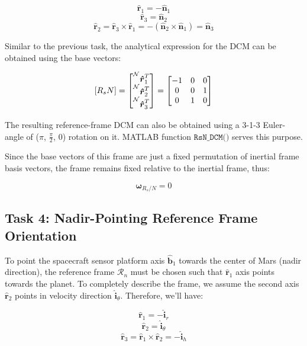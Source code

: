 \documentclass[12pt,a4paper]{report}
\begin{document}
	$$ \boldsymbol{\hat{r}}_1 = -\boldsymbol{\hat{n}}_1 $$
	$$ \boldsymbol{\hat{r}}_3 = \boldsymbol{\hat{n}}_2 $$
	$$ \boldsymbol{\hat{r}}_2 = \boldsymbol{\hat{r}}_3 \times \boldsymbol{\hat{r}}_1 = -(\boldsymbol{\hat{n}}_2\times\boldsymbol{\hat{n}}_1) = \boldsymbol{\hat{n}}_3$$
	
	Similar to the previous task, the analytical expression for the DCM can be obtained using the base vectors:
	
	$$[R_sN] = 
	\begin{bmatrix}
		\prescript{\mathcal{N}}{}{\boldsymbol{\hat{r}}_1 ^ T} \\
		\prescript{\mathcal{N}}{}{\boldsymbol{\hat{r}}_2 ^ T} \\
		\prescript{\mathcal{N}}{}{\boldsymbol{\hat{r}}_3 ^ T}
	\end{bmatrix}
	= \begin{bmatrix}
		-1 & 0 & 0 \\
		0 & 0 & 1 \\
		0 & 1 & 0
	\end{bmatrix}$$
	
	The resulting reference-frame DCM  can also be obtained using a 3-1-3 Euler-angle of ($\pi$, $\frac{\pi}{2}$, 0) rotation on it. MATLAB function $\texttt{RsN\_DCM()}$ serves this purpose.
	
	Since the base vectors of this frame are just a fixed permutation of inertial frame basis vectors, the frame remains fixed relative to the inertial frame, thus:
	
	$$ \boldsymbol{\omega}_{R_s/N} = 0$$

	
	\subsection{Task 4: Nadir-Pointing Reference Frame Orientation}
	
	To point the spacecraft sensor platform axis $ \boldsymbol{\hat{b}}_1 $ towards the center of Mars (nadir direction), the reference frame $\mathcal{R}_n$ must be chosen such that $ \boldsymbol{\hat{r}}_1 $ axis points towards the planet. To completely describe the frame, we assume the second axis $ \boldsymbol{\hat{r}}_2 $ points in velocity direction $ \boldsymbol{\hat{i}}_\theta $. Therefore, we'll have:
	
	$$  \boldsymbol{\hat{r}}_1 = -\boldsymbol{\hat{i}}_r $$
	$$
	 \boldsymbol{\hat{r}}_2 = \boldsymbol{\hat{i}}_\theta 
	$$
	$$ \boldsymbol{\hat{r}}_3 = \boldsymbol{\hat{r}}_1 \times \boldsymbol{\hat{r}}_2 = -\boldsymbol{\hat{i}}_h$$
	
\end{document}
